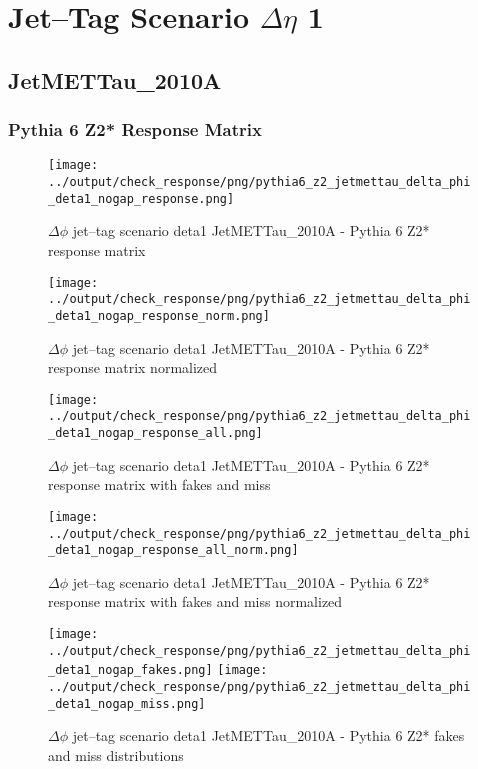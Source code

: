 \documentclass[11pt]{book}
\begin{document}
\newpage
\chapter{Jet--Tag Scenario $\Delta\eta$ 1}
\section{JetMETTau\_2010A}
\subsection{Pythia 6 Z2* Response Matrix}

\begin{figure}[ht]
\centering
\texttt{[image: ../output/check\_response/png/pythia6\_z2\_jetmettau\_delta\_phi\_deta1\_nogap\_response.png]}
\caption{$\Delta\phi$ jet--tag scenario deta1 JetMETTau\_2010A - Pythia 6 Z2* response matrix}
\label{p6_jetmettau_delta_phi_deta1_nogap_response}
\end{figure}

\begin{figure}[ht]
\centering
\texttt{[image: ../output/check\_response/png/pythia6\_z2\_jetmettau\_delta\_phi\_deta1\_nogap\_response\_norm.png]}
\caption{$\Delta\phi$ jet--tag scenario deta1 JetMETTau\_2010A - Pythia 6 Z2* response matrix normalized}
\label{p6_jetmettau_delta_phi_deta1_nogap_response_norm}
\end{figure}

\begin{figure}[ht]
\centering
\texttt{[image: ../output/check\_response/png/pythia6\_z2\_jetmettau\_delta\_phi\_deta1\_nogap\_response\_all.png]}
\caption{$\Delta\phi$ jet--tag scenario deta1 JetMETTau\_2010A - Pythia 6 Z2* response matrix with fakes and miss}
\label{p6_jetmettau_delta_phi_deta1_nogap_response_all}
\end{figure}

\begin{figure}[ht]
\centering
\texttt{[image: ../output/check\_response/png/pythia6\_z2\_jetmettau\_delta\_phi\_deta1\_nogap\_response\_all\_norm.png]}
\caption{$\Delta\phi$ jet--tag scenario deta1 JetMETTau\_2010A - Pythia 6 Z2* response matrix with fakes and miss normalized}
\label{p6_jetmettau_delta_phi_deta1_nogap_response_all_norm}
\end{figure}

\begin{figure}[ht]
\centering
\texttt{[image: ../output/check\_response/png/pythia6\_z2\_jetmettau\_delta\_phi\_deta1\_nogap\_fakes.png]}
\texttt{[image: ../output/check\_response/png/pythia6\_z2\_jetmettau\_delta\_phi\_deta1\_nogap\_miss.png]}
\caption{$\Delta\phi$ jet--tag scenario deta1 JetMETTau\_2010A - Pythia 6 Z2* fakes and miss distributions}
\label{p6_jetmettau_delta_phi_deta1_nogap_fakesmiss}
\end{figure}
\end{document}
